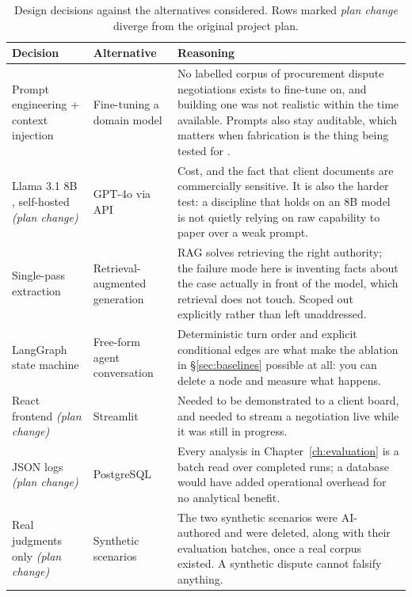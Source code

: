 \begin{table}[htbp]
\centering
\footnotesize
\caption[Design alternatives]{Design decisions against the alternatives considered.
Rows marked \emph{plan change} diverge from the original project plan.}
\label{tab:alternatives}
\begin{tabular}{|p{2.6cm}|p{3.0cm}|p{6.4cm}|}
\hline
\textbf{Decision} & \textbf{Alternative} & \textbf{Reasoning} \\
\hline
Prompt engineering + context injection & Fine-tuning a domain model &
 No labelled corpus of procurement dispute negotiations exists to fine-tune on,
 and building one was not realistic within the time available. Prompts also stay
 auditable, which matters when fabrication is the thing being tested for
 \citep{sclar2024quantifying}. \\
\hline
Llama 3.1 8B \citep{grattafiori2024llama}, self-hosted \emph{(plan change)} & GPT-4o via API &
 Cost, and the fact that client documents are commercially sensitive. It is
 also the harder test: a discipline that holds on an 8B model is not quietly
 relying on raw capability to paper over a weak prompt. \\
\hline
Single-pass extraction & Retrieval-augmented generation &
 RAG \citep{lewis2020rag} solves retrieving the right authority; the failure mode
 here is inventing facts about the case actually in front of the model, which
 retrieval does not touch. Scoped out explicitly rather than left unaddressed. \\
\hline
LangGraph state machine & Free-form agent conversation &
 Deterministic turn order and explicit conditional edges are what make the
 ablation in \S\ref{sec:baselines} possible at all: you can delete a node and
 measure what happens. \\
\hline
React frontend \emph{(plan change)} & Streamlit &
 Needed to be demonstrated to a client board, and needed to stream a
 negotiation live while it was still in progress. \\
\hline
JSON logs \emph{(plan change)} & PostgreSQL &
 Every analysis in Chapter~\ref{ch:evaluation} is a batch read over completed
 runs; a database would have added operational overhead for no analytical
 benefit. \\
\hline
Real judgments only \emph{(plan change)} & Synthetic scenarios &
 The two synthetic scenarios were AI-authored and were deleted, along with
 their evaluation batches, once a real corpus existed. A synthetic dispute
 cannot falsify anything. \\
\hline
\end{tabular}
\end{table}

